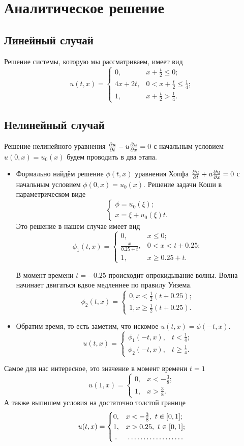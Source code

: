 
\section{Аналитическое решение}
\subsection{Линейный случай}
Решение системы, которую мы рассматриваем, имеет вид
\[
 u(t,x) = 
\begin{cases}
  0,& x+\frac t2\le 0;\\
  4x + 2t, &0<x+\frac t2 \le \frac14;\\
  1,& x+\frac t2>\frac14.
\end{cases}
\]
\subsection{Нелинейный случай}
Решение нелинейного уравнения $\frac{\partial u}{\partial t} - u\frac{\partial u}{\partial x}=0$ с начальным условием $u(0,x) = u_0(x)$ будем проводить в два этапа.
\begin{itemize}
\item Формально найдём решение $\phi(t,x)$ уравнения Хопфа $\frac{\partial u}{\partial t} + u\frac{\partial u}{\partial x}=0$ с начальным условием $\phi(0,x) = u_0(x)$. Решение задачи Коши в параметрическом виде
\[
  \begin{cases}
  \phi = u_0(\xi);\\
  x = \xi + u_0(\xi)t.
  \end{cases}
\]
Это решение в нашем случае имеет вид
\[
  \phi_1(t,x) = \begin{cases}
0,&x\le 0;\\
\frac{x}{0.25 + t},& 0<x<t+0.25;\\
1,& x\ge 0.25 +t.
\end{cases}
\]

В момент времени $t=-0.25$ происходит опрокидывание волны. Волна начинает двигаться вдвое медленнее по правилу Уизема. 
\[
  \phi_2(t,x) = \begin{cases}
0,x<\frac12(t+0.25);\\
1,x\ge\frac12(t+0.25).
\end{cases}
\]

\item Обратим время, то есть заметим, что искомое $u(t,x) = \phi(-t,x)$.
\[
  u(t,x) = \begin{cases}
\phi_1(-t,x),&t<\frac14;\\
\phi_2(-t,x),&t\ge \frac14.
\end{cases}
\]
\end{itemize}

Самое для нас интересное, это значение в момент времени $t=1$
\[
  u(1,x) = \begin{cases}
0,&x<-\frac38;\\
1,&x>\frac38.
\end{cases}
\]
А также выпишем условия на достаточно толстой границе
\[
  u(t,x) = \begin{cases}
    0,&x<-\frac38,\ t\in[0,1];\\
    1,&x>0.25,\ t\in[0,1];\\
\dotfill&\dotfill
\end{cases}
\]
